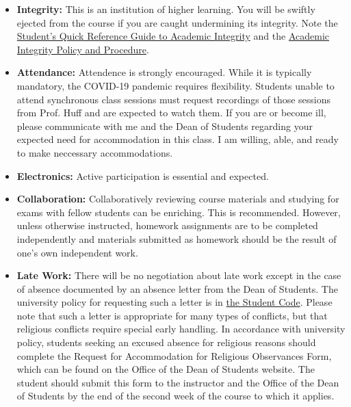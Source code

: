 \documentclass[11pt, a4paper]{article}
\begin{document}
\begin{itemize}
\item[] \textbf{Integrity:} This is an institution of higher
learning. You will be swiftly ejected from the course if you are caught
undermining its integrity. Note the
\href{http://www.provost.illinois.edu/academicintegrity/students.html}{Student's
Quick Reference Guide to Academic Integrity} and the
\href{http://studentcode.illinois.edu/article1_part4_1-401.html}{Academic
Integrity Policy and Procedure}.
\item[] \textbf{Attendance:} Attendence is strongly encouraged. While it is
        typically mandatory, the COVID-19 pandemic requires flexibility.
                Students unable to attend synchronous class sessions must
                request recordings of those sessions from Prof. Huff and are
                expected to watch them. If you are or become ill, please
                communicate with me and the Dean of Students regarding your
                expected need for accommodation in this class. I am willing,
                able, and ready to make neccessary accommodations.
\item[] \textbf{Electronics:} Active participation is essential and expected.
\item[] \textbf{Collaboration:} Collaboratively reviewing course materials and studying for exams with fellow students can be enriching.  This is recommended.  However, unless otherwise instructed, homework assignments are to be completed independently and materials submitted as homework should be the result of one's own independent work.
\item[] \textbf{Late Work:} There will be no negotiation about late work
        except in the case of absence documented by an absence letter from the
                Dean of Students.  The university policy for requesting such a
                letter is in
                \href{http://studentcode.illinois.edu/article1_part5_1-501.html}{the
                Student Code}. Please note that such a letter is appropriate
                for many types of conflicts, but that religious conflicts
                require special early handling. In accordance with university
                policy, students seeking an excused absence for religious
                reasons should complete the Request for Accommodation for
                Religious Observances Form, which can be found on the Office of
                the Dean of Students website. The student should submit this
                form to the instructor and the Office of the Dean of Students
                by the end of the second week of the course to which it
                applies.

\end{itemize}
\end{document}
